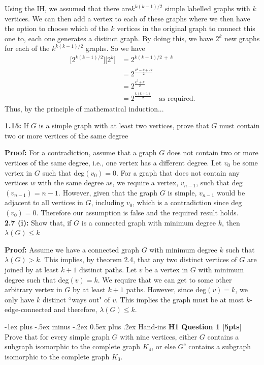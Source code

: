 \documentclass[10pt,landscape]{article}
\makeatletter
\renewcommand{\section}{\@startsection{section}{1}{0mm}%
                                {-1ex plus -.5ex minus -.2ex}%
                                {0.5ex plus .2ex}%
                                {\normalfont\large\bfseries}}
\makeatother
\begin{document}
\begin{multicols}{2}
\begin{itemize}
    Using the IH, we assumed that there are$k^{k(k-1)/2}$ simple labelled graphs with $k$ vertices. We can then add a vertex to each of these graphs where we then have the option to choose which of the $k$ vertices in the original graph to connect this one to, each one generates a distinct graph. By doing this, we have $2^k$ new graphs for each of the $k^{k(k-1)/2}$ graphs. So we have
    \begin{align*}
        \big[2^{k(k-1)/2}\big]\big[2^k\big] &= 2^{k(k-1)/2 \ + \ k}\\
        &=2^{\frac{k^2-k+2k}{2}}\\
        &=2^{\frac{k^2+k}{2}}\\
        &=2^{\frac{k(k+1)}{2}} \quad \text{as required.}
    \end{align*}
    Thus, by the principle of mathematical induction...
    \end{itemize}

\textbf{1.15:} If $G$ is a simple graph with at least two vertices, prove that $G$ must contain two or more vertices of the same degree

\textbf{Proof:} For a contradiction, assume that a graph $G$ does not contain two or more vertices of the same degree, i.e., one vertex has a different degree. Let $v_0$ be some vertex in $G$ such that deg$(v_0)=0$. For a graph that does not contain any vertices $w$ with the same degree as, we require a vertex, $v_{n-1}$, such that deg$(v_{n-1}) = n-1$. However, given that the graph $G$ is simple, $v_{n-1}$ would be adjacent to all vertices in $G$, including $v_0$, which is a contradiction since deg$(v_0)=0$. Therefore our assumption is false and the required result holds.\\
\bigskip
\textbf{2.7 (i):} Show that, if $G$ is a connected graph with minimum degree $k$, then $\lambda(G)\le k$

\textbf{Proof:} Assume we have a connected graph $G$ with minimum degree $k$ such that $\lambda(G)>k$. This implies, by theorem 2.4, that any two distinct vertices of $G$ are joined by at least $k+1$ distinct paths. Let $v$ be a vertex in $G$ with minimum degree such that deg$(v)=k$. We require that we can get to some other arbitrary vertex in $G$ by at least $k+1$ paths. However, since deg$(v)=k$, we only have $k$ distinct ``ways out" of $v$. This implies the graph must be at most $k$-edge-connected and therefore, $\lambda(G)\le k.$

\section{Hand-ins}
\textbf{H1}
\textbf{Question 1}
\textbf{[5pts]} Prove that for every simple graph $G$ with nine vertices, either $G$ contains a subgraph isomorphic to the complete graph $K_4$, or else $G^c$ contains a subgraph isomorphic to the complete graph $K_3$.\\
\bigskip


\end{multicols}
\end{document}
